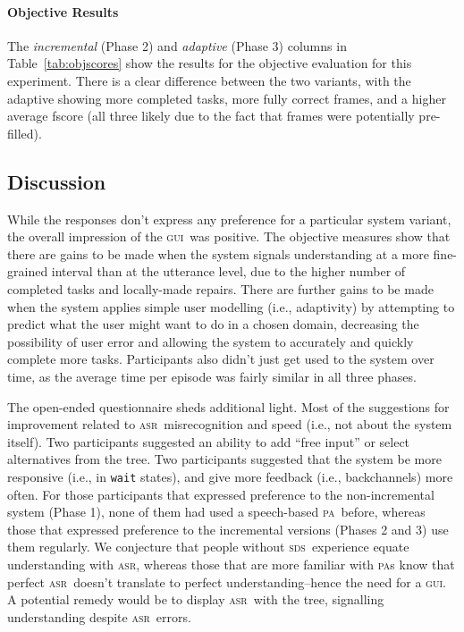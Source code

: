 \documentclass[11pt]{article}
\newcommand{\sds}[0]{\textsc{sds}}
\newcommand{\asr}[0]{\textsc{asr}}
\newcommand{\ui}[0]{\textsc{gui}}
\newcommand{\pa}[0]{\textsc{pa}}
\begin{document}
\paragraph{Objective Results} The \emph{incremental} (Phase 2) and \emph{adaptive} (Phase 3) columns in Table~\ref{tab:objscores} show the results for the objective evaluation for this experiment. There is a clear difference between the two variants, with the adaptive showing more completed tasks, more fully correct frames, and a higher average fscore (all three likely due to the fact that frames were potentially pre-filled). 

\subsection{Discussion}

While the responses don't express any preference for a particular system variant, the overall impression of the \ui\ was positive. The objective measures show that there are gains to be made when the system signals understanding at a more fine-grained interval than at the utterance level, due to the higher number of completed tasks and locally-made repairs. There are further gains to be made when the system applies simple user modelling (i.e., adaptivity) by attempting to predict what the user might want to do in a chosen domain, decreasing the possibility of user error and allowing the system to accurately and quickly complete more tasks. Participants also didn't just get used to the system over time, as the average time per episode was fairly similar in all three phases. 

The open-ended questionnaire sheds additional light. Most of the suggestions for improvement related to \asr\ misrecognition and speed (i.e., not about the system itself). Two participants suggested an ability to add ``free input'' or select alternatives from the tree. Two participants suggested that the system be more responsive (i.e., in \texttt{wait} states), and give more feedback (i.e., backchannels) more often. For those participants that expressed preference to the non-incremental system (Phase 1), none of them had used a speech-based \pa\ before, whereas those that expressed preference to the incremental versions (Phases 2 and 3) use them regularly. We conjecture that people without \sds\ experience equate understanding with \asr, whereas those that are more familiar with \pa s know that perfect \asr\ doesn't translate to perfect understanding--hence the need for a \ui. A potential remedy would be to display \asr\ with the tree, signalling understanding despite \asr\ errors.
\end{document}
